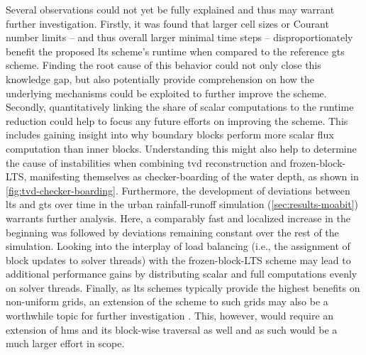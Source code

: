 Several observations could not yet be fully explained and thus may warrant further investigation.
Firstly, it was found that larger cell sizes or Courant number limits -- and thus overall larger minimal time steps -- disproportionately benefit the proposed \gls{lts} scheme's runtime when compared to the reference \gls{gts} scheme.
Finding the root cause of this behavior could not only close this knowledge gap, but also potentially provide comprehension on how the underlying mechanisms could be exploited to further improve the scheme.
Secondly, quantitatively linking the share of scalar computations to the runtime reduction could help to focus any future efforts on improving the scheme. 
This includes gaining insight into why boundary blocks perform more scalar flux computation than inner blocks.
Understanding this might also help to determine the cause of instabilities when combining \gls{tvd} reconstruction and \gls{frozen-block-LTS}, manifesting themselves as checker-boarding of the water depth, as shown in \autoref{fig:tvd-checker-boarding}.
Furthermore, the 
development of deviations between \gls{lts} and \gls{gts} over time in the urban rainfall-runoff simulation (\autoref{sec:results-moabit}) warrants further analysis. 
Here, a comparably fast and localized increase in the beginning was followed by deviations remaining constant over the rest of the simulation.
Looking into the interplay of load balancing (i.e., the assignment of block updates to solver threads) with the \gls{frozen-block-LTS} scheme may lead to additional performance gains by distributing scalar and full computations evenly on solver threads.
Finally, as \gls{lts} schemes typically provide the highest benefits on non-uniform grids, an extension of the scheme to such grids may also be a worthwhile topic for further investigation \autocite{crossley2003,sanders2008}. 
This, however, would require an extension of \gls{hms} and its block-wise traversal as well and as such would be a much larger effort in scope.



